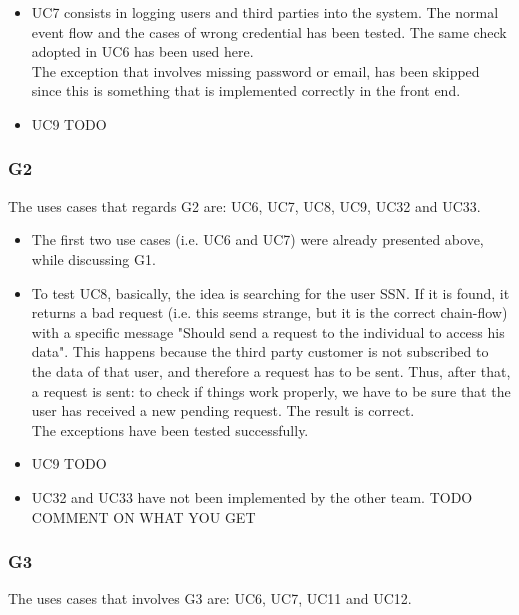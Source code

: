 \begin{itemize}
\item UC7 consists in logging users and third parties into the system. The normal event flow and the cases of wrong credential has been
tested.
The same check adopted in UC6 has been used here. \\ 
The exception that involves missing password or email, has been skipped since this is something that is implemented correctly in the front 
end.

\item UC9 TODO

\end{itemize}


\subsubsection{G2}
The uses cases that regards G2 are: UC6, UC7, UC8, UC9, UC32 and UC33.  \\


\begin{itemize}
\item The first two use cases (i.e. UC6 and UC7) were already presented above, while discussing G1.

\item To test UC8, basically, the idea is searching for the user SSN. 
If it is found, it returns a bad request (i.e. this seems strange, but it is the correct chain-flow) with a specific message "Should send a
request to the individual to access his data". This happens because the third party customer is not subscribed to the data of that user, and
therefore a request has to be sent.
Thus, after that, a request is sent: to check if things work properly, we have to be sure that the user has received a new pending request. 
The result is correct.  \\
The exceptions have been tested successfully. 

\item UC9 TODO

\item UC32 and UC33 have not been implemented by the other team. TODO COMMENT ON WHAT YOU GET

\end{itemize}

\subsubsection{G3}
The uses cases that involves G3 are: UC6, UC7, UC11 and UC12.  \\

